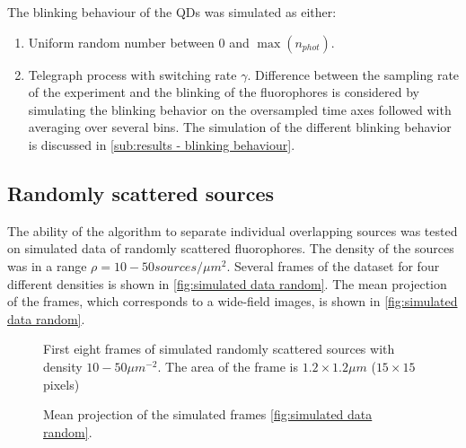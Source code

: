 The blinking behaviour of the QDs was simulated as either:
%
\begin{enumerate}
	\item
	Uniform random number between $0$ and $\max(n_{phot})$.
	\item
	Telegraph process with switching rate $\gamma$. Difference between the sampling rate of the experiment and the blinking of the fluorophores is considered by simulating the blinking behavior on the oversampled time axes followed with averaging over several bins. The simulation of the different blinking behavior is discussed in \autoref{sub:results - blinking behaviour}. 
\end{enumerate}
 
\clearpage
\subsection{Randomly scattered sources\label{sub:Simul random}}
The ability of the algorithm to separate individual overlapping sources was tested on simulated data of randomly scattered fluorophores.     The density of the sources was in a range $\rho=10-50 \unit{sources/\mu m^{2}}$. Several frames of the dataset for four different densities is shown in  \autoref{fig:simulated data random}. The mean projection of the frames, which corresponds to a wide-field images, is shown in \autoref{fig:simulated data random}.

\begin{figure}[!htb]	
	\newcommand{\widthfig}{1\textwidth}
	\centering	
	
	
	\caption{First eight frames of simulated randomly scattered sources with density $10-50\unit{\mu m^{-2}}$. The area of the frame is $1.2\times1.2\unit{\mu m}$ ($15\times15$ pixels)}
	\label{fig:simulated data random}
\end{figure} 
%
\begin{figure}[!htb]	
	\newcommand{\widthfig}{.3\textwidth}
	\centering	
	\hspace{.3cm}	
	\hspace{.3cm}	
	\caption{Mean projection of the simulated frames \autoref{fig:simulated data random}.}
	\label{fig:simulated data random - mean}
\end{figure} 

